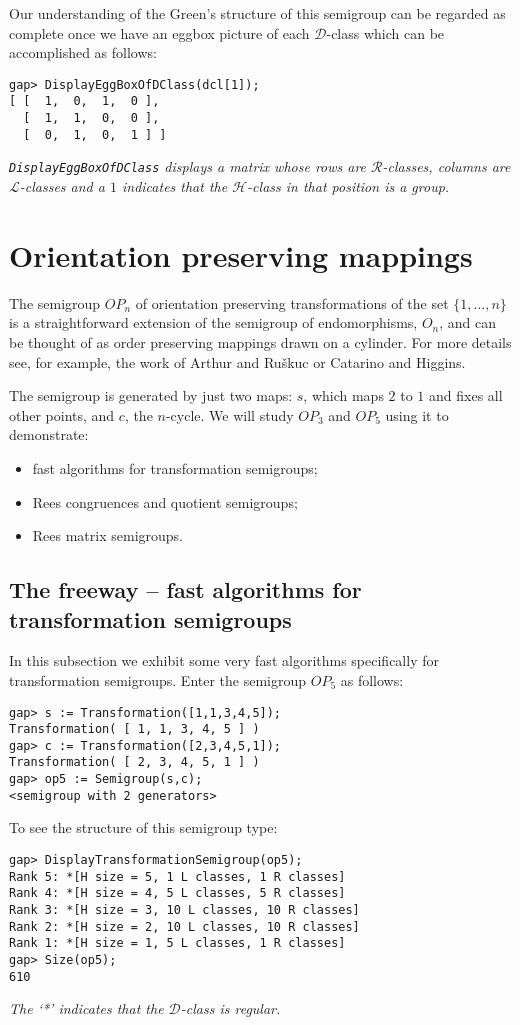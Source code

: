 \documentclass{ws-p8-50x6-00}
\theoremstyle{plain} \newtheorem{Thm}{Theorem}
\theoremstyle{plain} \newtheorem{Cor}{Corollary}
\theoremstyle{plain} \newtheorem{Lemma}{Lemma}
\theoremstyle{plain} \newtheorem{Prop}{Proposition}
\theoremstyle{plain} \newtheorem{Ex}{Exercise}
\def\d{${\mathcal{D}}$}
\def\l{${\mathcal{L}}$}
\def\r{${\mathcal{R}}$}
\def\h{${\mathcal{H}}$}
\begin{document}
Our understanding of the Green's structure of this semigroup 
can be regarded as complete once we have an eggbox picture of 
each \d-class which can be accomplished as follows:
\begin{verbatim}
gap> DisplayEggBoxOfDClass(dcl[1]);
[ [  1,  0,  1,  0 ],
  [  1,  1,  0,  0 ],
  [  0,  1,  0,  1 ] ]
\end{verbatim}
{\em {\tt DisplayEggBoxOfDClass} displays a matrix whose rows are
{\r}-classes, columns are {\l}-classes and a $1$ indicates that the
{\h}-class in that position is a group.}

\section{Orientation preserving mappings}
The semigroup $OP_n$ of orientation preserving transformations
of the set $\{1, \ldots, n\}$
is a straightforward extension of the semigroup of endomorphisms,
$O_n$, and can be thought
of as order preserving mappings drawn on a cylinder. For more details see,
for example, the work of Arthur and Ru\v{s}kuc\cite{arthur_opn} or 
Catarino and Higgins\cite{cathig_opn}.

The semigroup is generated by just two maps: $s$, which maps 
$2$ to $1$ and fixes all other points,  and $c$, the $n$-cycle.
We will study $OP_3$ and $OP_5$ using it to demonstrate:
\begin{itemize}
\item fast algorithms for transformation semigroups;
\item Rees congruences and quotient semigroups;
\item Rees matrix semigroups.
\end{itemize}

\subsection{The freeway -- fast algorithms for transformation semigroups}
In this subsection we exhibit some very fast algorithms specifically
for transformation semigroups.  Enter the semigroup $OP_5$ as follows:

\begin{verbatim}
gap> s := Transformation([1,1,3,4,5]); 
Transformation( [ 1, 1, 3, 4, 5 ] )
gap> c := Transformation([2,3,4,5,1]);
Transformation( [ 2, 3, 4, 5, 1 ] )
gap> op5 := Semigroup(s,c);
<semigroup with 2 generators>
\end{verbatim}

To see the structure of this semigroup type:
\begin{verbatim}
gap> DisplayTransformationSemigroup(op5);
Rank 5: *[H size = 5, 1 L classes, 1 R classes]
Rank 4: *[H size = 4, 5 L classes, 5 R classes]
Rank 3: *[H size = 3, 10 L classes, 10 R classes]
Rank 2: *[H size = 2, 10 L classes, 10 R classes]
Rank 1: *[H size = 1, 5 L classes, 1 R classes]
gap> Size(op5);
610
\end{verbatim}
{\em The `*' indicates that the \d-class is regular.}
\end{document}
